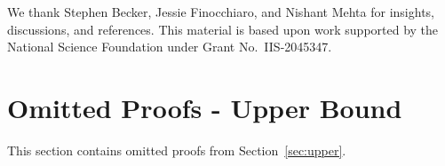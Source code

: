 \documentclass{article}
\theoremstyle{definition}\newtheorem{definition}{Definition}
\theoremstyle{definition}\newtheorem{assumption}{Assumption}
\begin{document}




\begin{ack}
  We thank
  Stephen Becker, %
  Jessie Finocchiaro,
  and
  Nishant Mehta for insights, discussions, and references.
  This material is based upon work supported by the National Science Foundation under Grant No.\ IIS-2045347.
\end{ack}











\appendix

\section{Omitted Proofs - Upper Bound} \label{app:upper}
This section contains omitted proofs from Section~\ref{sec:upper}.
\end{document}
